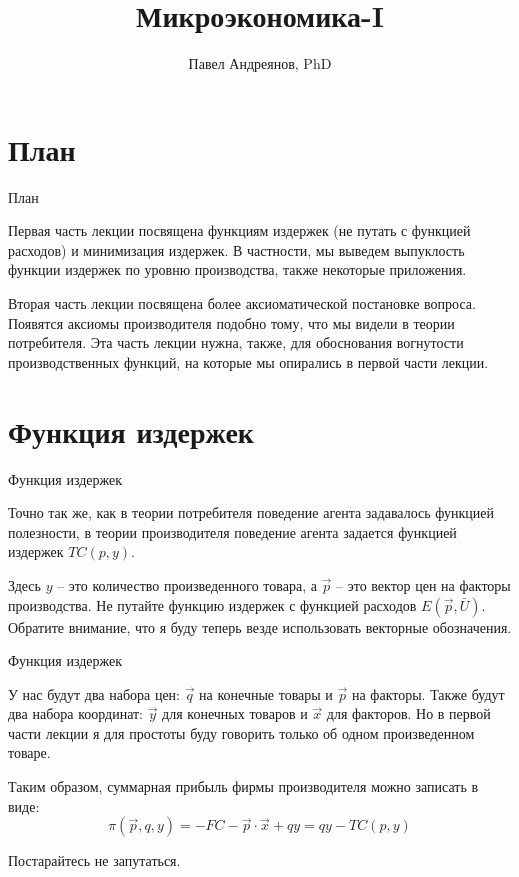 \documentclass{beamer}
\title{
Микроэкономика-I
}
\author{
Павел Андреянов, PhD
}
\begin{document}
\maketitle

\section{План}

\begin{frame}{План}

Первая часть лекции посвящена функциям издержек (не путать с функцией расходов) и минимизация издержек. В частности, мы выведем выпуклость функции издержек по уровню производства, также некоторые приложения.

Вторая часть лекции посвящена более аксиоматической постановке вопроса. Появятся аксиомы производителя подобно тому, что мы видели в теории потребителя. Эта часть лекции нужна, также, для обоснования вогнутости производственных функций, на которые мы опирались в первой части лекции.

\end{frame}


\section{Функция издержек}

\begin{frame}{Функция издержек}

Точно так же, как в теории потребителя поведение агента задавалось функцией полезности, в теории производителя поведение агента задается функцией издержек $TC(p, y)$.

Здесь $y$ – это количество произведенного товара, а $\vec p$ – это вектор цен на факторы производства. Не путайте функцию издержек с функцией расходов $E(\vec p, \bar U)$. Обратите внимание, что я буду теперь везде использовать векторные обозначения.

\end{frame}

\begin{frame}{Функция издержек}

У нас будут два набора цен: $\vec q$ на конечные товары и $\vec p$ на факторы. Также будут два набора координат: $\vec y$ для конечных товаров и $\vec x$ для факторов. Но в первой части лекции я для простоты буду говорить только об одном произведенном товаре.

Таким образом, суммарная прибыль фирмы производителя можно записать в виде:
$$ \pi(\vec p, q, y) = - FC - \vec p \cdot \vec x + q y = q y - TC(p, y)$$

Постарайтесь не запутаться.

\end{frame}
\end{document}
